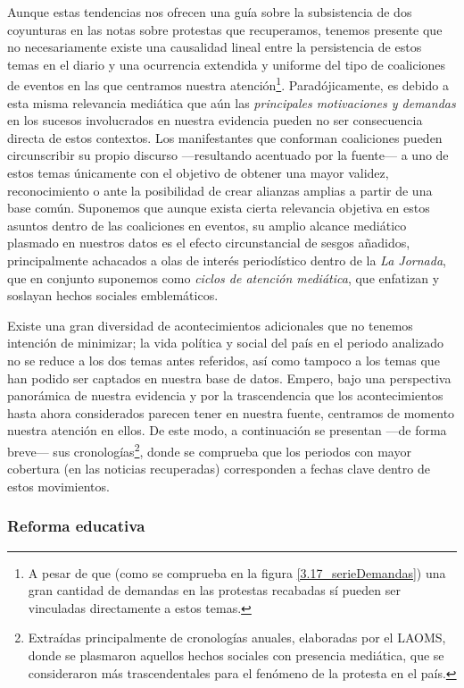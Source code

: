 \documentclass[letterpaper, 11pt]{book}
\theoremstyle{definition}
\theoremstyle{remark}
\begin{document}
Aunque estas tendencias nos ofrecen una guía sobre la subsistencia de dos coyunturas en las notas sobre protestas que recuperamos, tenemos presente que no necesariamente existe una causalidad lineal entre la persistencia de estos temas en el diario y una ocurrencia extendida y uniforme del tipo de coaliciones de eventos en las que centramos nuestra atención\footnote{
    A pesar de que (como se comprueba en la figura \ref{3.17_serieDemandas}) una gran cantidad de demandas en las protestas recabadas sí pueden ser vinculadas directamente a estos temas. 
}. 
Paradójicamente, es debido a esta misma relevancia mediática que aún las \emph{principales motivaciones y demandas} en los sucesos involucrados en nuestra evidencia pueden no ser consecuencia directa de estos contextos. 
Los manifestantes que conforman coaliciones 
pueden circunscribir su propio discurso ---resultando acentuado por la fuente--- a uno de estos temas únicamente con el objetivo de obtener una mayor validez, reconocimiento o ante la posibilidad de crear alianzas amplias a partir de una base común. 
Suponemos que aunque exista cierta relevancia objetiva en estos asuntos dentro de las coaliciones en eventos, su amplio alcance mediático plasmado en nuestros datos
es el efecto circunstancial de sesgos añadidos, principalmente achacados a olas de interés periodístico dentro de la \emph{La Jornada}, que en conjunto suponemos como \emph{ciclos de atención mediática}, que enfatizan y soslayan hechos sociales emblemáticos. 


Existe una gran diversidad de acontecimientos adicionales que no tenemos intención de minimizar; la vida política y social del país en el periodo analizado no se reduce a los dos temas antes referidos, así como tampoco a los temas que han podido ser captados en nuestra base de datos. 
Empero, bajo una perspectiva panorámica de nuestra evidencia y por la trascendencia que los acontecimientos hasta ahora considerados parecen tener en nuestra fuente, centramos de momento nuestra atención en ellos. 
De este modo, a continuación se presentan ---de forma breve--- sus cronologías\footnote{
    Extraídas principalmente de cronologías anuales, elaboradas por el LAOMS, donde se plasmaron aquellos hechos sociales con presencia mediática, que se consideraron más trascendentales para el fenómeno de la protesta en el país. 
}, donde se comprueba que los periodos con mayor cobertura (en las noticias recuperadas) corresponden a fechas clave dentro de estos movimientos. 




\subsubsection{Reforma educativa}
\label{sec:ReformaEducativa}
\end{document}
